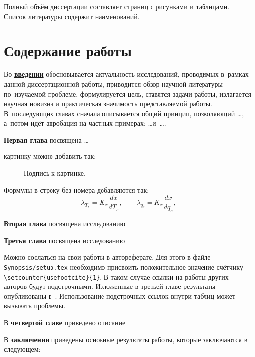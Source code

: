 {\acknowledge}


Полный объём диссертации составляет  страниц с  рисунками
и  таблицами. Список литературы содержит   наименований.


\section*{Содержание работы}
Во \underline{\textbf{введении}} обосновывается актуальность
исследований, проводимых в~рамках данной диссертационной работы,
приводится обзор научной литературы по~изучаемой проблеме,
формулируется цель, ставятся задачи работы, излагается научная новизна
и практическая значимость представляемой работы. В~последующих главах
сначала описывается общий принцип, позволяющий \dots, а~потом идёт
апробация на частных примерах: \dots  и~\dots.


\underline{\textbf{Первая глава}} посвящена \dots

картинку можно добавить так:
\begin{figure}[ht]
    \caption{Подпись к картинке.}\label{fig:latex}
\end{figure}

Формулы в строку без номера добавляются так:
\[
  \lambda_{T_s} = K_x\frac{d{x}}{d{T_s}}, \qquad
  \lambda_{q_s} = K_x\frac{d{x}}{d{q_s}},
\]

\underline{\textbf{Вторая глава}} посвящена исследованию

\underline{\textbf{Третья глава}} посвящена исследованию

Можно сослаться на свои работы в автореферате. Для этого в файле
\verb!Synopsis/setup.tex! необходимо присвоить положительное значение
счётчику \verb!\setcounter{usefootcite}{1}!. В таком случае ссылки на
работы других авторов будут подстрочными.
Изложенные в третьей главе результаты опубликованы в~\cite{vakbib1, vakbib2}.
Использование подстрочных ссылок внутри таблиц может вызывать проблемы.

В \underline{\textbf{четвертой главе}} приведено описание

\FloatBarrier
{}                                  %
В \underline{\textbf{заключении}} приведены основные результаты работы, которые заключаются в следующем:


